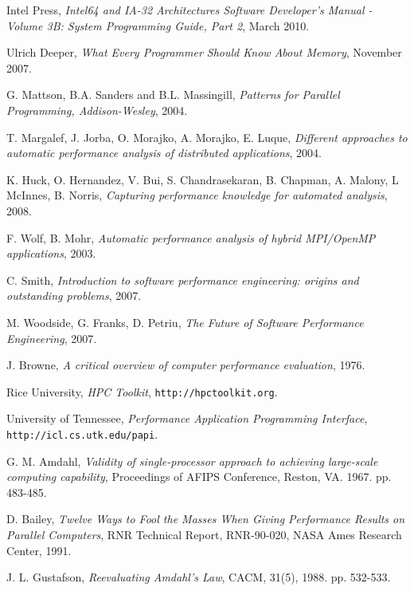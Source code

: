 \documentclass[a4paper]{report}
\begin{document}
\begin{thebibliography}{9}
  Intel Press,
  \emph{Intel64 and IA-32 Architectures Software Developer's Manual - Volume
    3B: System Programming Guide, Part 2},
  March 2010.

  Ulrich Deeper,
  \emph{What Every Programmer Should Know About Memory},
  November 2007.

  G. Mattson, B.A. Sanders and B.L. Massingill, 
  \emph{Patterns for Parallel Programming, Addison-Wesley},
  2004.
  
  T. Margalef, J. Jorba, O. Morajko, A. Morajko, E. Luque,
  \emph{Different approaches to automatic performance analysis of distributed
    applications},
  2004.
  
  K. Huck, O. Hernandez, V. Bui, S. Chandrasekaran, B. Chapman, A. Malony,
  L McInnes, B. Norris,
  \emph{Capturing performance knowledge for automated analysis},
  2008.
  
  F. Wolf, B. Mohr,
  \emph{Automatic performance analysis of hybrid MPI/OpenMP applications},
  2003.
  
  C. Smith,
  \emph{Introduction to software performance engineering: origins and
    outstanding problems},
  2007.

  M. Woodside, G. Franks, D. Petriu,
  \emph{The Future of Software Performance Engineering},
  2007.

  J. Browne,
  \emph{A critical overview of computer performance evaluation},
  1976.

  Rice University,
  \emph{HPC Toolkit}, {\tt http://hpctoolkit.org}.
       
  University of Tennessee,
  \emph{Performance Application Programming Interface},
       {\tt http://icl.cs.utk.edu/papi}.
       
  G. M. Amdahl,
  \emph{Validity of single-processor approach to achieving large-scale
    computing capability},
  Proceedings of AFIPS Conference, Reston, VA. 1967. pp. 483-485.
  
  D. Bailey, \emph{Twelve Ways to Fool the Masses When Giving Performance
    Results on Parallel Computers},
  RNR Technical Report, RNR-90-020, NASA Ames Research Center, 1991.
  
  J. L. Gustafson,
  \emph{Reevaluating Amdahl's Law}, CACM, 31(5), 1988. pp. 532-533.
  

\end{thebibliography}
\end{document}
